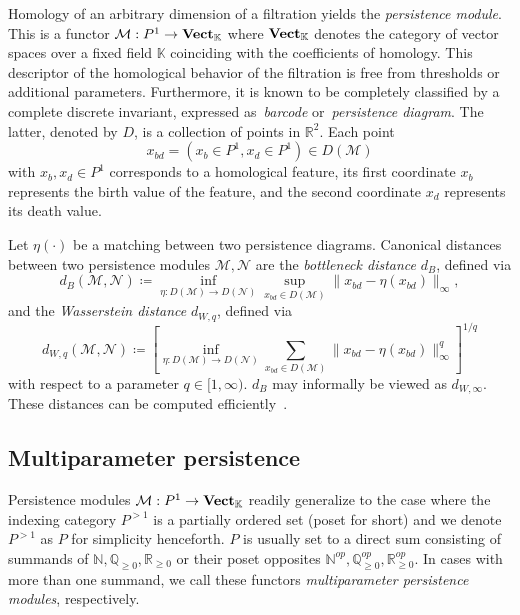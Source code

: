 \documentclass[sigconf, nonacm, natbib=false]{acmart} %
\def\M {{\mathcal{M}}}
\def\N {{\mathcal{N}}}
\def\NN{{\mathbb{N}}}
\def\RR{{\mathbb{R}}}
\def\QQ{{\mathbb{Q}}}
\def\vect{\bf Vect}
\theoremstyle{plain}
\begin{document}
Homology of an arbitrary dimension of a filtration yields the \emph{persistence module}. 
This is a functor $\M:P^1\rightarrow\vect_{\mathbb{K}}$ where $\vect_{\mathbb{K}}$ denotes the category of vector spaces over a fixed field $\mathbb{K}$ coinciding with the coefficients of homology.
This descriptor of the homological behavior of the filtration is free from thresholds or additional parameters. 
Furthermore, it is known to be completely classified by a complete discrete invariant, expressed as~\emph{barcode} or~\emph{persistence diagram}. 
The latter, denoted by $D$, is a collection of points in $\RR^2$. Each point 
\begin{equation}
x_{bd}=(x_b\in P^1, x_d\in P^1)\in D(\mathcal{M})\label{eq:xbd}\end{equation}
with $x_b, x_d \in P^1$ corresponds to a homological feature, its first coordinate $x_b$ represents the birth value of the feature, and the second coordinate $x_d$ represents its death value. 

Let $\eta(\cdot)$ be a matching between two persistence diagrams. Canonical distances between two persistence modules $\M,\N$ are the \emph{bottleneck distance} $d_B$, defined via
{\scriptsize
\begin{equation}
  d_B(\M,\N)\coloneqq \inf_{\eta:D(\M)\rightarrow D(\N)} \sup_{x_{bd}\in D(\M)} \lVert x_{bd} - \eta(x_{bd}) \rVert_\infty,   \label{eq:bottleneck_dist}
\end{equation}
}
and the \emph{Wasserstein distance} $d_{W,q}$, defined via
{\scriptsize
\begin{equation}
  d_{W,q}(\M,\N)\coloneqq {\left[ \inf_{\eta:D(\M)\rightarrow D(\N)} \sum_{x_{bd}\in D(\M)}\lVert x_{bd} - \eta(x_{bd}) \rVert_\infty^q \right]} ^{1/q}
\end{equation}}
with respect to a parameter $q\in[1,\infty)$. $d_B$ may informally be viewed as $d_{W,\infty}$.
These distances can be computed efficiently~\cite{kerber2016geometry}.

\subsection{Multiparameter persistence}
Persistence modules $\M:P^1\rightarrow\vect_{\mathbb{K}}$ readily generalize to the case
where the indexing category $P^{>1}$ is a partially ordered set (poset for short) and we denote $P^{>1}$ as $P$ for simplicity henceforth. 
$P$ is usually set to a direct sum consisting of summands of $\NN,\QQ_{\geq0},\RR_{\geq0}$ or their poset opposites $\NN^{op},\QQ_{\geq0}^{op},\RR_{\geq0}^{op}$. 
In cases with more than one summand, we call these functors \emph{multiparameter persistence modules}, respectively.
\end{document}
